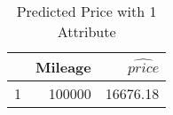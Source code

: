 \begin{table}[ht]
\centering
\begin{tabular}{rrr}
  \hline
 & Mileage & $\widehat{price}$ \\ 
  \hline
1 & 100000 & 16676.18 \\ 
   \hline
\end{tabular}
\caption{Predicted Price with 1 Attribute} 
\label{tab:1p_predict}
\end{table}
